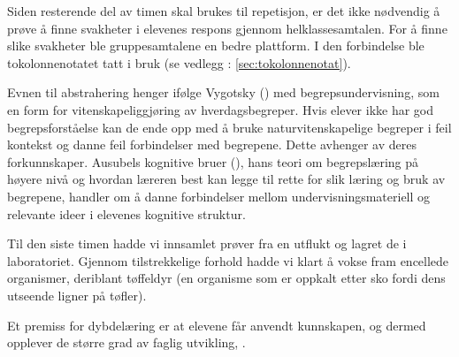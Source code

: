 \documentclass[main.tex]{subfiles}
\begin{document}



Siden resterende del av timen skal brukes til repetisjon, er det ikke nødvendig å 
prøve å finne svakheter i elevenes respons gjennom helklassesamtalen. For å finne slike svakheter 
ble gruppesamtalene en bedre plattform. I den forbindelse ble tokolonnenotatet tatt i bruk (se 
vedlegg : \ref{sec:tokolonnenotat}).

Evnen til abstrahering henger ifølge Vygotsky () med begrepsundervisning, som en
form for vitenskapeliggjøring av hverdagsbegreper. Hvis elever ikke har god begrepsforståelse
kan de ende opp med å bruke naturvitenskapelige begreper i feil kontekst og danne feil 
forbindelser med begrepene. Dette avhenger av deres forkunnskaper. Ausubels kognitive bruer 
(), hans teori om begrepslæring på høyere nivå og hvordan læreren best kan legge 
til rette for slik læring og bruk av begrepene,  handler om å danne forbindelser mellom undervisningsmateriell
og relevante ideer i elevenes kognitive struktur.

Til den siste timen hadde vi innsamlet prøver fra en utflukt og lagret de i laboratoriet. 
Gjennom tilstrekkelige forhold hadde vi klart å vokse fram encellede organismer, deriblant tøffeldyr 
(en organisme som er oppkalt etter sko fordi dens utseende ligner på tøfler).

Et premiss for dybdelæring er at elevene får anvendt kunnskapen, og dermed opplever de større grad av faglig utvikling, .
\end{document}
